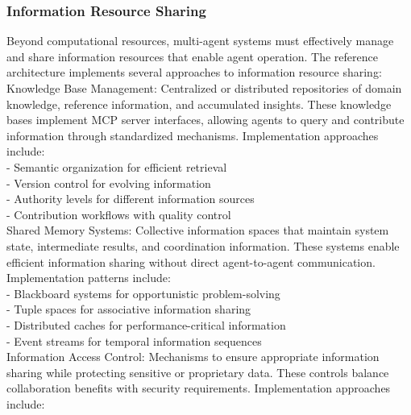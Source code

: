 \subsubsection{Information Resource Sharing}
Beyond computational resources, multi-agent systems must effectively manage and share information resources that enable agent operation. The reference architecture implements several approaches to information resource sharing:\\ \newline
Knowledge Base Management: Centralized or distributed repositories of domain knowledge, reference information, and accumulated insights. These knowledge bases implement MCP server interfaces, allowing agents to query and contribute information through standardized mechanisms. Implementation approaches include:\\ \newline
- Semantic organization for efficient retrieval\\ \newline
- Version control for evolving information\\ \newline
- Authority levels for different information sources\\ \newline
- Contribution workflows with quality control\\ \newline
Shared Memory Systems: Collective information spaces that maintain system state, intermediate results, and coordination information. These systems enable efficient information sharing without direct agent-to-agent communication. Implementation patterns include:\\ \newline
- Blackboard systems for opportunistic problem-solving\\ \newline
- Tuple spaces for associative information sharing\\ \newline
- Distributed caches for performance-critical information\\ \newline
- Event streams for temporal information sequences\\ \newline
Information Access Control: Mechanisms to ensure appropriate information sharing while protecting sensitive or proprietary data. These controls balance collaboration benefits with security requirements. Implementation approaches include:\\ \newline

